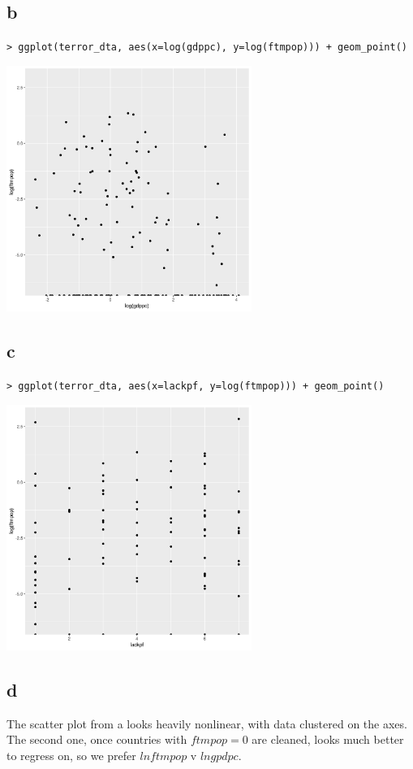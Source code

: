 \documentclass[12pt,letterpaper]{article}
\theoremstyle{definition}
\begin{document}
\subsection*{b}
\verb|> ggplot(terror_dta, aes(x=log(gdppc), y=log(ftmpop))) + geom_point()|
\begin{center}
  \includegraphics[width=0.6\textwidth]{figures/2b.png}
\end{center}
\subsection*{c}
\verb|> ggplot(terror_dta, aes(x=lackpf, y=log(ftmpop))) + geom_point()|
\begin{center}
  \includegraphics[width=0.6\textwidth]{figures/2c.png}
\end{center}
\subsection*{d}

The scatter plot from a looks heavily nonlinear, with data clustered on the axes. The second one, once countries with $ftmpop = 0$ are cleaned, looks much better to regress on, so we prefer $lnftmpop$ v $lngpdpc$.
\end{document}
